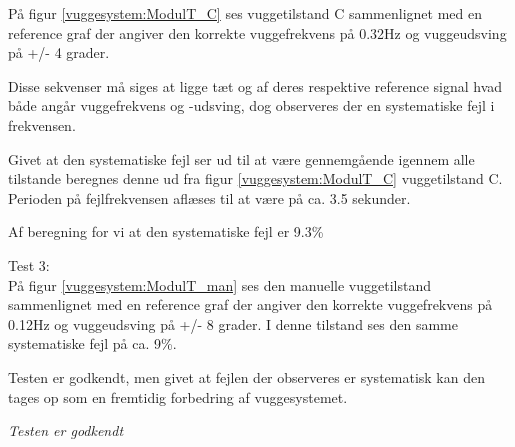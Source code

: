 På figur \ref{vuggesystem:ModulT_C} ses vuggetilstand C sammenlignet med en reference graf der angiver den korrekte vuggefrekvens på 0.32Hz og vuggeudsving på +/- 4 grader.

Disse sekvenser må siges at ligge tæt og af deres respektive reference signal hvad både angår vuggefrekvens og -udsving, dog observeres der en systematiske fejl i frekvensen.

Givet at den systematiske fejl ser ud til at være gennemgående igennem alle tilstande beregnes denne ud fra figur \ref{vuggesystem:ModulT_C} vuggetilstand C. Perioden på fejlfrekvensen aflæses til at være på ca. 3.5 sekunder.

Af beregning for vi at den systematiske fejl er 9.3\%

Test 3: \\
På figur \ref{vuggesystem:ModulT_man} ses den manuelle vuggetilstand sammenlignet med en reference graf der angiver den korrekte vuggefrekvens på 0.12Hz og vuggeudsving på +/- 8 grader. I denne tilstand ses den samme systematiske fejl på ca. 9\%.

Testen er godkendt, men givet at fejlen der observeres er systematisk kan den tages op som en fremtidig forbedring af vuggesystemet.

\textit{Testen er godkendt}